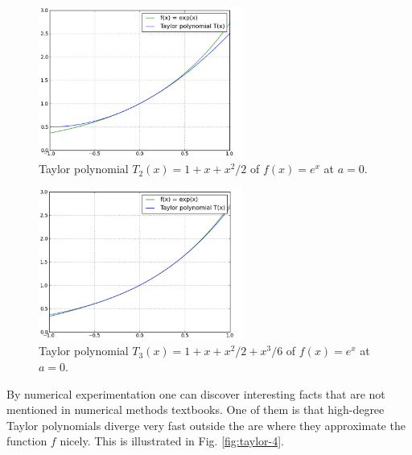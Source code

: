 \documentclass[article,A4,12pt]{llncs}
\begin{document}
\begin{figure}[!ht]
\begin{center}
\includegraphics[width=0.6\textwidth]{img/taylor-2.png}
\end{center}
\vspace{-2mm}
\caption{Taylor polynomial $T_2(x) = 1+x+x^2/2$ of $f(x) = e^x$ at $a = 0$.}
\label{fig:taylor-2}
\vspace{6mm}
\end{figure}

\begin{figure}[!ht]
\begin{center}
\includegraphics[width=0.6\textwidth]{img/taylor-3.png}
\end{center}
\vspace{-2mm}
\caption{Taylor polynomial $T_3(x) = 1+x+x^2/2+x^3/6$ of $f(x) = e^x$ at $a = 0$.}
\label{fig:taylor-3}
\end{figure}
\noindent
By numerical experimentation one can discover interesting facts that are not 
mentioned in numerical methods textbooks. One of them is that high-degree 
Taylor polynomials diverge very fast outside the are where they 
approximate the function $f$ nicely. This is illustrated in Fig. \ref{fig:taylor-4}.
\end{document}
